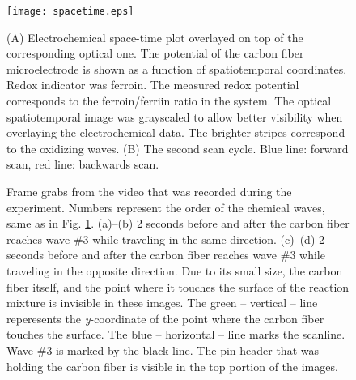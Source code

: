 \documentclass[3p, twocolumn]{elsarticle}
\begin{document}
\def\s{0.5}
\begin{figure}
\centering
{}
\texttt{[image: spacetime.eps]}
\caption{(A) Electrochemical space-time plot overlayed on top of the corresponding optical one.
The potential of the carbon fiber microelectrode is shown as a function of spatiotemporal coordinates.
Redox indicator was ferroin.
The measured redox potential corresponds to the ferroin/ferriin ratio in the system.
The optical spatiotemporal image was grayscaled to allow better visibility when overlaying the electrochemical data.
The brighter stripes correspond to the oxidizing waves.
(B) The second scan cycle.
Blue line: forward scan, red line: backwards scan.
}
\label{fig:spatiotemporal}
\end{figure}

\begin{figure}
\centering
{}
\caption{Frame grabs from the video that was recorded during the experiment.
Numbers represent the order of the chemical waves, same as in Fig. \ref{fig:spatiotemporal}.
(a)--(b) 2 seconds before and after the carbon fiber reaches wave \#3 while traveling in the same direction.
(c)--(d) 2 seconds before and after the carbon fiber reaches wave \#3 while traveling in the opposite direction.
Due to its small size, the carbon fiber itself, and the point where it touches the surface of the reaction mixture is invisible in these images.
The green -- vertical -- line reperesents the \emph{y}-coordinate of the point where the carbon fiber touches the surface.
The blue -- horizontal -- line marks the scanline.
Wave \#3 is marked by the black line.
The pin header that was holding the carbon fiber is visible in the top portion of the images.
}
\label{fig:grabs2}
\end{figure}
\end{document}

